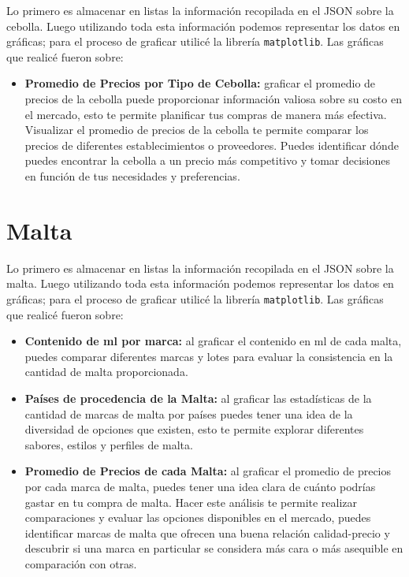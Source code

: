 \documentclass[a4paper, 12pt]{article}
\begin{document}
Lo primero es almacenar en listas la información recopilada en el JSON sobre la cebolla. Luego 
utilizando toda esta información podemos representar los datos en gráficas; para el proceso de graficar
utilicé la librería \texttt{matplotlib}. Las gráficas que realicé fueron sobre:

\begin{itemize}
    \item \textbf{Promedio de Precios por Tipo de Cebolla:} graficar el promedio de precios de la cebolla puede proporcionar 
    información valiosa sobre su costo en el mercado, esto te permite planificar tus compras de manera más efectiva. Visualizar el promedio 
de precios de la cebolla te permite comparar los precios de diferentes establecimientos o proveedores.
 Puedes identificar dónde puedes encontrar la cebolla a un precio más competitivo y tomar decisiones 
 en función de tus necesidades y preferencias.

\end{itemize}

\section{Malta}

Lo primero es almacenar en listas la información recopilada en el JSON sobre la malta. Luego 
utilizando toda esta información podemos representar los datos en gráficas; para el proceso de graficar
utilicé la librería \texttt{matplotlib}. Las gráficas que realicé fueron sobre:

\begin{itemize}
    \item \textbf{Contenido de ml por marca:} al graficar el contenido en ml de cada malta, puedes comparar diferentes marcas y lotes para evaluar 
la consistencia en la cantidad de malta proporcionada.

\item \textbf{Países de procedencia de la Malta:} al graficar las estadísticas de la cantidad de marcas de malta por países puedes tener una idea de la
 diversidad de opciones que existen, esto te permite explorar diferentes sabores, estilos y perfiles 
 de malta.

 \item \textbf{Promedio de Precios de cada Malta:} al graficar el promedio de precios por cada marca de malta, puedes tener una idea clara de cuánto
 podrías gastar en tu compra de malta. Hacer este análisis te permite realizar comparaciones y 
 evaluar las opciones disponibles en el mercado, puedes identificar marcas de malta que ofrecen 
 una buena relación calidad-precio y descubrir si una marca en particular se considera más cara o
 más asequible en comparación con otras.

\end{itemize}
\end{document}
